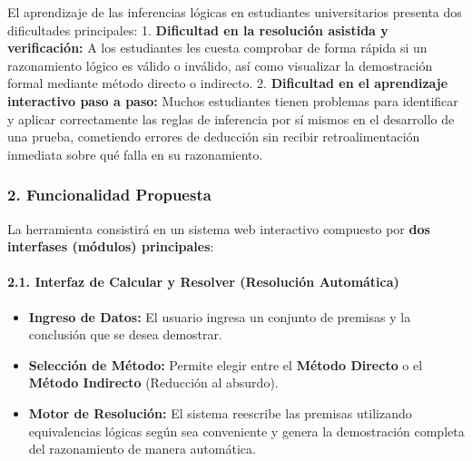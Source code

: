 \documentclass[11pt,a4paper,openany]{book}
\begin{document}
El aprendizaje de las inferencias lógicas en estudiantes universitarios presenta dos dificultades principales:
1. \textbf{Dificultad en la resolución asistida y verificación:} A los estudiantes les cuesta comprobar de forma rápida si un razonamiento lógico es válido o inválido, así como visualizar la demostración formal mediante método directo o indirecto.
2. \textbf{Dificultad en el aprendizaje interactivo paso a paso:} Muchos estudiantes tienen problemas para identificar y aplicar correctamente las reglas de inferencia por sí mismos en el desarrollo de una prueba, cometiendo errores de deducción sin recibir retroalimentación inmediata sobre qué falla en su razonamiento.

\hrulefill

\subsubsection{2. Funcionalidad Propuesta}

La herramienta consistirá en un sistema web interactivo compuesto por \textbf{dos interfases (módulos) principales}:

\paragraph{2.1. Interfaz de Calcular y Resolver (Resolución Automática)}
\begin{itemize}[leftmargin=*]
\item \textbf{Ingreso de Datos:} El usuario ingresa un conjunto de premisas y la conclusión que se desea demostrar.
\item \textbf{Selección de Método:} Permite elegir entre el \textbf{Método Directo} o el \textbf{Método Indirecto} (Reducción al absurdo).
\item \textbf{Motor de Resolución:} El sistema reescribe las premisas utilizando equivalencias lógicas según sea conveniente y genera la demostración completa del razonamiento de manera automática.
\end{itemize}
\end{document}

